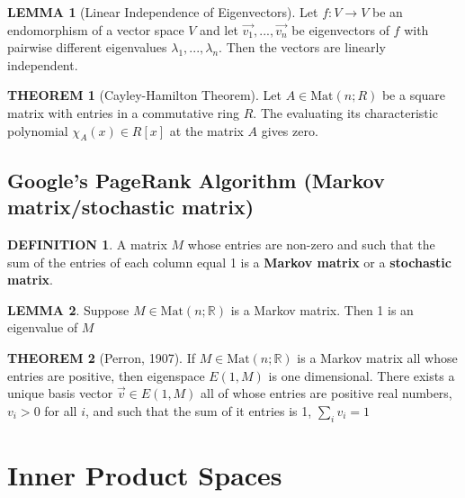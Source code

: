 \documentclass[12pt]{article}
\theoremstyle{definition}
\newtheorem{definition}{DEFINITION}[subsection]
\newtheorem{theorem}{THEOREM}[subsection]
\newcommand{\Mat}{\text{Mat}}
\newtheorem{lemma}{LEMMA}[subsection]
\begin{document}
\begin{lemma}[Linear Independence of Eigenvectors]
    Let $f:V \rightarrow V$ be an endomorphism of a vector space $V$ and let $\vec{v_1}, ...,\vec{v_n}$ be eigenvectors of $f$ with pairwise different eigenvalues $\lambda_1, ..., \lambda_n$. Then the vectors are linearly independent.
\end{lemma}

\begin{theorem}[Cayley-Hamilton Theorem]
    Let $A \in \Mat(n;R)$ be a square matrix with entries in a commutative ring $R$. The evaluating its characteristic polynomial $\chi_{A}(x)\in R[x]$ at the matrix $A$ gives zero.
\end{theorem}


\subsection{Google’s PageRank Algorithm (Markov matrix/stochastic matrix)}
\begin{definition}
    A matrix $M$ whose entries are non-zero and such that the sum of the entries of each column equal 1 is a \textbf{Markov matrix} or a \textbf{stochastic matrix}.
\end{definition}

\begin{lemma}
    Suppose $M\in \Mat(n;\mathbb{R})$ is a Markov matrix. Then 1 is an eigenvalue of $M$
\end{lemma}

\begin{theorem}[Perron, 1907]
    If $M \in \Mat(n;\mathbb{R})$ is a Markov matrix all whose entries are positive, then eigenspace $E(1,M)$ is one dimensional. There exists a unique basis vector $\vec{v} \in E(1,M)$ all of whose entries are positive real numbers, $v_i > 0$ for all $i$, and such that the sum of it entries is 1, $\sum_i v_i = 1$
\end{theorem}


\section{Inner Product Spaces}
\end{document}
